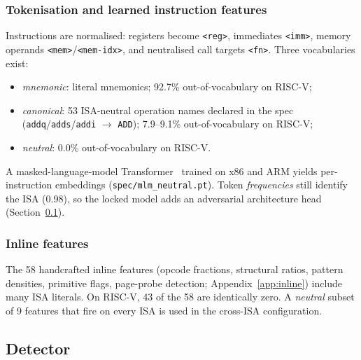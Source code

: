 \documentclass[conference]{IEEEtran}
\begin{document}
\subsubsection{Tokenisation and learned instruction features}
Instructions are normalised: registers become \texttt{<reg>}, immediates
\texttt{<imm>}, memory operands \texttt{<mem>}/\texttt{<mem-idx>}, and
neutralised call targets \texttt{<fn>}. Three vocabularies exist:
\begin{itemize}[itemsep=0pt,leftmargin=1.2em]
  \item \emph{mnemonic}: literal mnemonics; 92.7\% out-of-vocabulary on RISC-V;
  \item \emph{canonical}: 53 ISA-neutral operation names declared in the spec
    (\texttt{addq}/\texttt{adds}/\texttt{addi} $\to$ \texttt{ADD}); 7.9--9.1\%
    out-of-vocabulary on RISC-V;
  \item \emph{neutral}: 0.0\% out-of-vocabulary on RISC-V.
\end{itemize}
A masked-language-model Transformer~\cite{devlin2019} trained on x86 and ARM
yields per-instruction embeddings (\texttt{spec/mlm\_neutral.pt}). Token
\emph{frequencies} still identify the ISA (0.98), so the locked model adds an
adversarial architecture head (Section~\ref{sec:detector}).

\subsubsection{Inline features}
The 58 handcrafted inline features (opcode fractions, structural ratios,
pattern densities, primitive flags, page-probe detection;
Appendix~\ref{app:inline}) include many ISA literals. On RISC-V, 43 of the 58 are
identically zero. A \emph{neutral} subset of 9 features that fire on every ISA
is used in the cross-ISA configuration.


\subsection{Detector}
\label{sec:detector}
\end{document}
